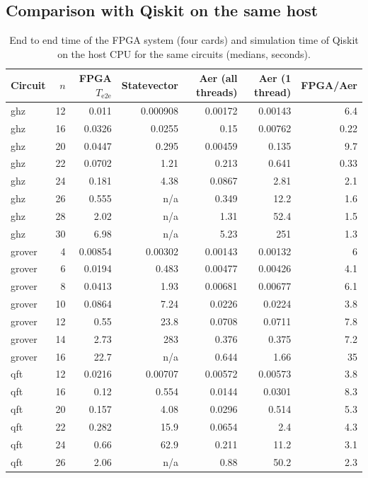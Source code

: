 \documentclass[pdflatex,sn-mathphys-num]{sn-jnl}
\theoremstyle{thmstyleone}
\theoremstyle{thmstylethree}
\begin{document}
\subsection{Comparison with Qiskit on the same host}\label{subsec:res-cpu}

\begin{table}[t]
\caption{End to end time of the FPGA system (four cards) and simulation time of Qiskit on the host CPU for the same
circuits (medians, seconds).}\label{tab:cpu}
\begin{tabular}{@{}lrrrrrr@{}}
\toprule
Circuit & $n$ & FPGA $T_{\mathrm{e2e}}$ & Statevector & Aer (all threads) & Aer (1 thread) & FPGA/Aer \\
\midrule
ghz & 12 & 0.011 & 0.000908 & 0.00172 & 0.00143 & 6.4 \\
ghz & 16 & 0.0326 & 0.0255 & 0.15 & 0.00762 & 0.22 \\
ghz & 20 & 0.0447 & 0.295 & 0.00459 & 0.135 & 9.7 \\
ghz & 22 & 0.0702 & 1.21 & 0.213 & 0.641 & 0.33 \\
ghz & 24 & 0.181 & 4.38 & 0.0867 & 2.81 & 2.1 \\
ghz & 26 & 0.555 & n/a & 0.349 & 12.2 & 1.6 \\
ghz & 28 & 2.02 & n/a & 1.31 & 52.4 & 1.5 \\
ghz & 30 & 6.98 & n/a & 5.23 & 251 & 1.3 \\
grover & 4 & 0.00854 & 0.00302 & 0.00143 & 0.00132 & 6 \\
grover & 6 & 0.0194 & 0.483 & 0.00477 & 0.00426 & 4.1 \\
grover & 8 & 0.0413 & 1.93 & 0.00681 & 0.00677 & 6.1 \\
grover & 10 & 0.0864 & 7.24 & 0.0226 & 0.0224 & 3.8 \\
grover & 12 & 0.55 & 23.8 & 0.0708 & 0.0711 & 7.8 \\
grover & 14 & 2.73 & 283 & 0.376 & 0.375 & 7.2 \\
grover & 16 & 22.7 & n/a & 0.644 & 1.66 & 35 \\
qft & 12 & 0.0216 & 0.00707 & 0.00572 & 0.00573 & 3.8 \\
qft & 16 & 0.12 & 0.554 & 0.0144 & 0.0301 & 8.3 \\
qft & 20 & 0.157 & 4.08 & 0.0296 & 0.514 & 5.3 \\
qft & 22 & 0.282 & 15.9 & 0.0654 & 2.4 & 4.3 \\
qft & 24 & 0.66 & 62.9 & 0.211 & 11.2 & 3.1 \\
qft & 26 & 2.06 & n/a & 0.88 & 50.2 & 2.3 \\

\end{tabular}
\end{table}
\end{document}
